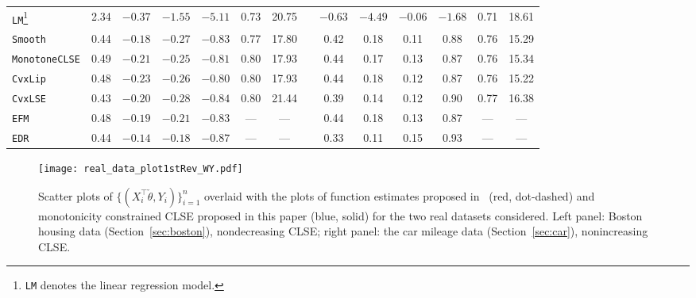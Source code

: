 {\begin{table}[h]
\begin{adjustbox}{max width=\textwidth}
\begin{tabular}{l*{13}{c}}
 \midrule
\texttt{LM}\footnote{\texttt{LM} denotes the linear regression model.}  &  2.34 & $-0.37$ & $-1.55$ & $-5.11$ &  0.73 & 20.75& & $-0.63$ & $-4.49$ & $-0.06$ & $-1.68$ &  0.71 & 18.61\\
\texttt{Smooth} &  0.44 & $-0.18$ & $-0.27$ & $-0.83$ &  0.77 & 17.80& &0.42 &  0.18 &  0.11 &  0.88 &  0.76 &15.29\\
\texttt{MonotoneCLSE} &  0.49 & $-0.21$ & $-0.25$ & $-0.81$ &  0.80 & 17.93& &0.44 &  0.17 &  0.13 &  0.87 &  0.76 & 15.34\\
\texttt{CvxLip} &  0.48 & $-0.23$ & $-0.26$ & $-0.80$ &  0.80 & 17.93&  &0.44 &  0.18 &  0.12 &  0.87 &  0.76& 15.22 \\
\texttt{CvxLSE} &  0.43 & $-0.20$ & $-0.28$ & $-0.84$ &  0.80 & 21.44&  &0.39 &  0.14 &  0.12 &  0.90 &  0.77 &16.38\\
\texttt{EFM} &  0.48 & $-0.19$ & $-0.21$ & $-0.83$ &  --- & --- & &0.44 &  0.18 &  0.13 &  0.87 &--- &  --- \\
\texttt{EDR} &  0.44 & $-0.14$ & $-0.18$ & $-0.87$ &  --- &--- &  &0.33 &  0.11 &  0.15 &  0.93 & --- & --- \\

\bottomrule



\end{tabular}
\end{adjustbox}

\end{table}

\begin{figure}[h!]
\centering
\texttt{[image: real\_data\_plot1stRev\_WY.pdf]}
  \caption[]{Scatter plots of $\{(X_i^\top\check{\theta}, Y_i)\}_{i=1}^n$ overlaid with the plots of function estimates proposed in~\cite{MR2529970} (red, dot-dashed) and monotonicity constrained CLSE proposed in this paper (blue, solid) for the two real datasets considered. Left panel: Boston housing data (Section~\ref{sec:boston}), nondecreasing CLSE; right panel: the car mileage data (Section~\ref{sec:car}), nonincreasing CLSE.}
  \label{fig:real_data_plot}
\end{figure}

}
